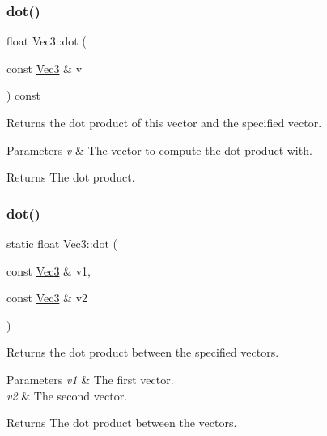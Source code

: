 \subsubsection{\texorpdfstring{dot()}{dot()}\hspace{0.1cm}{\footnotesize\ttfamily [1/4]}}
{\footnotesize\ttfamily float Vec3\+::dot (\begin{DoxyParamCaption}\item[{const \hyperlink{classVec3}{Vec3} \&}]{v }\end{DoxyParamCaption}) const}

Returns the dot product of this vector and the specified vector.


\begin{DoxyParams}{Parameters}
{\em v} & The vector to compute the dot product with.\\
\hline
\end{DoxyParams}
\begin{DoxyReturn}{Returns}
The dot product. 
\end{DoxyReturn}
\mbox{\label{classVec3_aae0b305ff841ec72ce2204a9778e9664}} 
\subsubsection{\texorpdfstring{dot()}{dot()}\hspace{0.1cm}{\footnotesize\ttfamily [2/4]}}
{\footnotesize\ttfamily static float Vec3\+::dot (\begin{DoxyParamCaption}\item[{const \hyperlink{classVec3}{Vec3} \&}]{v1,  }\item[{const \hyperlink{classVec3}{Vec3} \&}]{v2 }\end{DoxyParamCaption})\hspace{0.3cm}{\ttfamily [static]}}

Returns the dot product between the specified vectors.


\begin{DoxyParams}{Parameters}
{\em v1} & The first vector. \\
\hline
{\em v2} & The second vector.\\
\hline
\end{DoxyParams}
\begin{DoxyReturn}{Returns}
The dot product between the vectors. 
\end{DoxyReturn}
\mbox{\label{classVec3_a7dde977821ca85d8651f4c91e35d4275}} 
